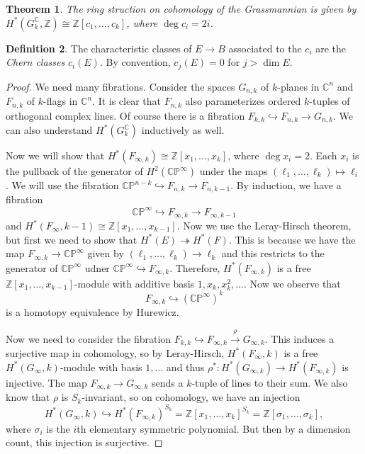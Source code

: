 \documentclass[leqno, openany]{memoir}
\newtheorem{thm}{Theorem}[section]
\theoremstyle{definition}
\newtheorem{defn}[thm]{Definition}
\theoremstyle{remark}
\theoremstyle{plain}
\theoremstyle{definition}
\theoremstyle{remark}
\newcommand{\C}{\mathbb{C}}
\newcommand{\Z}{\mathbb{Z}}
\renewcommand{\P}{\mathbb{P}}
\begin{document}
\begin{thm} The ring struction on cohomology of the Grassmannian is given by
$H^*(G_k^{\C}, \Z) \cong \Z[c_1, \ldots, c_k]$, where $\deg c_i = 2i$.
\end{thm}

\begin{defn} The characteristic classes of $E \to B$ associated to the $c_i$
are the \textit{Chern classes} $c_i(E)$. By convention, $c_j(E) = 0$ for $j >
\dim E$.  \end{defn}

\begin{proof} We need many fibrations. Consider the spaces $G_{n,k}$ of
    $k$-planes in $\C^n$ and $F_{n,k}$ of $k$-flags in $\C^n$. It is clear that
    $F_{n,k}$ also parameterizes ordered $k$-tuples of orthogonal complex
    lines. Of course there is a fibration $F_{k, k} \hookrightarrow F_{n,k} \to
    G_{n,k}$. We can also understand $H^*(G_k^{\C})$ inductively as well.

    Now we will show that $H^*(F_{\infty,k}) \cong \Z[x_1, \ldots, x_k]$, where
    $\deg x_i = 2$. Each $x_i$ is the pullback of the generator of
    $H^2(\C\P^{\infty})$ under the maps $(\ell_1, \ldots, \ell_k) \mapsto
    \ell_i$. We will use the fibration $\C\P^{n-k} \hookrightarrow F_{n,k} \to
    F_{n,k-1}$. By induction, we have a fibration \[ \C\P^{\infty}
    \hookrightarrow F_{\infty, k} \to F_{\infty, k-1} \] and $H^*(F_{\infty},
    k-1) \cong \Z[x_1, \ldots, x_{k-1}]$. Now we use the Leray-Hirsch theorem,
    but first we need to show that $H^*(E) \twoheadrightarrow H^*(F)$. This is
    because we have the map $F_{\infty, k} \to \C\P^{\infty}$ given by
    $(\ell_1, \ldots, \ell_k) \to \ell_k$ and this restricts to the generator
    of $\C\P^{\infty}$ udner $\C\P^{\infty} \hookrightarrow F_{\infty, k}$.
    Therefore, $H^*(F_{\infty,k})$ is a free $\Z[x_1, \ldots, x_{k-1}]$-module
    with additive basis $1, x_k, x_k^2, \ldots$. Now we observe that \[
    F_{\infty, k} \hookrightarrow {(\C\P^{\infty})}^k \] is a homotopy
    equivalence by Hurewicz.

    Now we need to consider the fibration $F_{k,k} \hookrightarrow F_{\infty,
    k} \xrightarrow{\rho} G_{\infty, k}$. This induces a surjective map in
    cohomology, so by Leray-Hirsch, $H^*(F_{\infty}, k)$ is a free
    $H^*(G_{\infty}, k)$-module with basis $1, \ldots$ and thus $\rho^* \colon
    H^*(G_{\infty, k}) \to H^*(F_{\infty, k})$ is injective. The map
    $F_{\infty, k} \to G_{\infty, k}$ sends a $k$-tuple of lines to their sum.
    We also know that $\rho$ is $S_k$-invariant, so on cohomology, we have an
    injection \[ H^*(G_{\infty}, k) \hookrightarrow {H^*(F_{\infty,k})}^{S_k} =
    {\Z[x_1, \ldots, x_k]}^{S_k} = \Z[\sigma_1, \ldots, \sigma_k], \] where
$\sigma_i$ is the $i$th elementary symmetric polynomial. But then by a
dimension count, this injection is surjective.  \end{proof}
\end{document}
